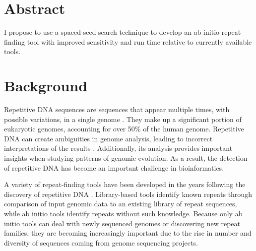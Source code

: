 \documentclass[12pt]{article}
\begin{document}


\section*{Abstract} 
I propose to use a spaced-seed search technique to develop an ab initio repeat-finding tool with improved sensitivity and run time relative to currently available tools.

\section*{Background}
Repetitive DNA sequences are sequences that appear multiple times, with possible variations, in a single genome \cite{lander2001initial}. 
They make up a significant portion of eukaryotic genomes, accounting for over 50\% of the human genome.
Repetitive DNA can create ambiguities in genome analysis, leading to incorrect interpretations of the results \cite{treangen2012repetitive}. 
Additionally, its analysis provides important insights when studying patterns of genomic evolution. 
As a result, the detection of repetitive DNA has become an important challenge in bioinformatics.

A variety of repeat-finding tools have been developed in the years following the discovery of repetitive DNA \cite{saha2008computational}. 
Library-based tools identify known repeats through comparison of input genomic data to an existing library of repeat sequences, while ab initio tools identify repeats without such knowledge. 
Because only ab initio tools can deal with newly sequenced genomes or discovering new repeat families, they are becoming increasingly important due to the rise in number and diversity of sequences coming from genome sequencing projects. 
\end{document}
